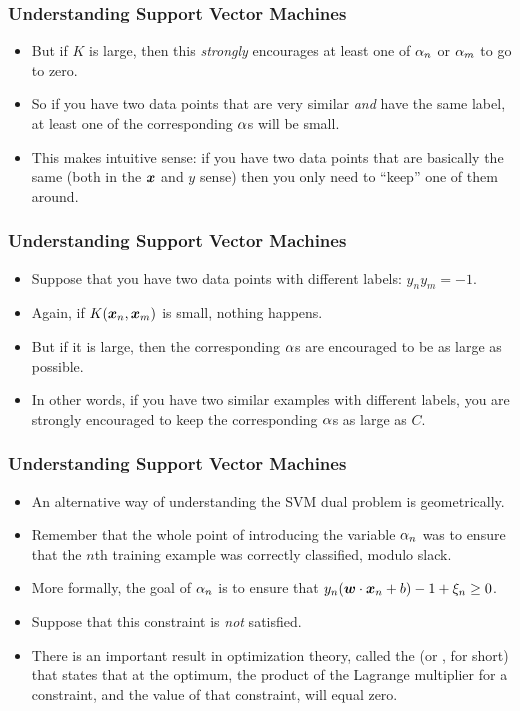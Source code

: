 \documentclass[trans]{beamer}
\begin{document}
\begin{frame}
  \frametitle{Understanding Support Vector Machines}
\begin{itemize}
\item  But if $K$ is large, then this \emph{strongly} encourages at
least one of $\alpha_n$ or $\alpha_m$ to go to zero.  
\item So if you have two
data points that are very similar \emph{and} have the same label, at
least one of the corresponding $\alpha$s will be small. 
\item This makes
intuitive sense: if you have two data points that are basically the
same (both in the ${\boldsymbol{x}}$ and $y$ sense) then you only need to ``keep''
one of them around.
\end{itemize}
\end{frame}

\begin{frame}
  \frametitle{Understanding Support Vector Machines}
\begin{itemize}
\item 
Suppose that you have two data points with different labels: $y_n y_m
= -1$.
\item  Again, if $K({\boldsymbol{x}}_n,{\boldsymbol{x}}_m)$ is small, nothing happens.  
\item But if
it is large, then the corresponding $\alpha$s are encouraged to be as
large as possible. 
\item In other words, if you have two similar examples
with different labels, you are strongly encouraged to keep the
corresponding $\alpha$s as large as $C$.
\end{itemize}
\end{frame}

\begin{frame}
  \frametitle{Understanding Support Vector Machines}
\begin{itemize}
\item 
An alternative way of understanding the SVM dual problem is
geometrically.
\item  Remember that the whole point of introducing the
variable $\alpha_n$ was to ensure that the $n$th training example was
correctly classified, modulo slack. 
\item More formally, the goal of
$\alpha_n$ is to ensure that $y_n ({\boldsymbol{w}} \cdot {\boldsymbol{x}}_n+b) - 1 + \xi_n \geq 0$.
\item Suppose that this constraint is \emph{not} satisfied. 
\item There is an
important result in optimization theory, called the
 (or ,
for short) that states that at the optimum, the product of the
Lagrange multiplier for a constraint, and the value of that
constraint, will equal zero. 
\end{itemize}
\end{frame}
\end{document}
